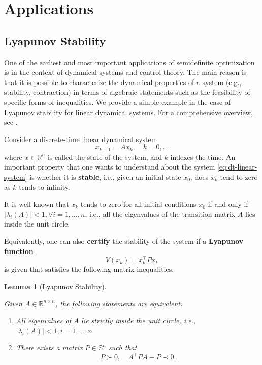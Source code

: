 \documentclass[
]{book}
\newtheorem{lemma}{Lemma}[chapter]
\theoremstyle{definition}
\theoremstyle{definition}
\theoremstyle{definition}
\theoremstyle{definition}
\theoremstyle{remark}
\begin{document}
\section{Applications}\label{applications}

\subsection{Lyapunov Stability}\label{lyapunov-stability}

One of the earliest and most important applications of semidefinite optimization is in the context of dynamical systems and control theory. The main reason is that it is possible to characterize the dynamical properties of a system (e.g., stability, contraction) in terms of algebraic statements such as the feasibility of specific forms of inequalities. We provide a simple example in the case of Lyapunov stability for linear dynamical systems. For a comprehensive overview, see \citep{boyd94book-lmi}.

Consider a discrete-time linear dynamical system
\begin{equation}
x_{k+1} = A x_k,\quad k=0,\dots
\label{eq:dt-linear-system}
\end{equation}
where \(x \in \mathbb{R}^{n}\) is called the state of the system, and \(k\) indexes the time. An important property that one wants to understand about the system \eqref{eq:dt-linear-system} is whether it is \textbf{stable}, i.e., given an initial state \(x_0\), does \(x_k\) tend to zero as \(k\) tends to infinity.

It is well-known that \(x_k\) tends to zero for all initial conditions \(x_0\) if and only if \(|\lambda_i(A)| < 1, \forall i=1,\dots,n\), i.e., all the eigenvalues of the transition matrix \(A\) lies inside the unit circle.

Equivalently, one can also \textbf{certify} the stability of the system if a \textbf{Lyapunov function}
\begin{equation}
V(x_k) = x_k^\top P x_k
\label{eq:Lyapunov-function}
\end{equation}
is given that satisfies the following matrix inequalities.

\begin{lemma}[Lyapunov Stability]
\protect\hypertarget{lem:LyapunovStability}{}\label{lem:LyapunovStability}

Given \(A \in \mathbb{R}^{n \times n}\), the following statements are equivalent:

\begin{enumerate}
\def\labelenumi{\arabic{enumi}.}
\item
  All eigenvalues of \(A\) lie strictly inside the unit circle, i.e., \(|\lambda_i(A)| < 1, i=1,\dots,n\)
\item
  There exists a matrix \(P \in \mathbb{S}^{n}\) such that
  \[
  P \succ 0, \quad A^\top P A - P \prec 0.
  \]
\end{enumerate}

\end{lemma}
\end{document}
